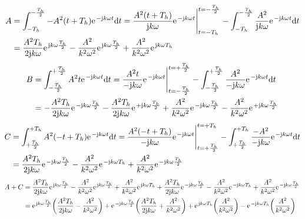 \documentclass[11pt,a4paper,DIV=12]{scrartcl}
\newcommand{\diff}{\mathrm{d}}
\begin{document}
\begin{align}
	A&=\int_{-T_h}^{-\frac{T_h}{2}}-A^2(t+T_h)\e^{-\im k \omega t}\diff t=\frac{A^2(t+T_h)}{\im k \omega }\e^{-\im k \omega t}\Bigg |_{t=-T_h}^{t=-\frac{T_h}{2}}-\int_{-T_h}^{-\frac{T_h}{2}}\frac{A^2}{\im k \omega }\e^{-\im k \omega t}\diff t\nonumber \\
	&=\frac{A^2T_h}{2\im k \omega }\e^{\im k \omega \frac{T_h}{2}}-\frac{A^2}{k^2\omega^2}\e^{\im k \omega \frac{T_h}{2}}+\frac{A^2}{k^2\omega^2}\e^{\im k \omega T_h}
\end{align}
\begin{align}
	B&=\int_{-\frac{T_h}{2}}^{+\frac{T_h}{2}}A^2t\e^{-\im k \omega t}\diff t=\frac{A^2t}{-\im k \omega}\e^{-\im k \omega t}\Bigg |_{t=-\frac{T_h}{2}}^{t=+\frac{T_h}{2}}-\int_{-\frac{T_h}{2}}^{+\frac{T_h}{2}}\frac{A^2}{-\im k \omega}\e^{-\im k \omega t}\diff t\nonumber \\
	&=-\frac{A^2T_h}{2\im k \omega}\e^{-\im k \omega \frac{T_h}{2}}-\frac{A^2T_h}{2\im k \omega}\e^{+\im k \omega \frac{T_h}{2}}+\frac{A^2}{k^2\omega^2}\e^{-\im k \omega \frac{T_h}{2}}-\frac{A^2}{ k^2 \omega^2}\e^{+\im k \omega \frac{T_h}{2}}
\end{align}
\begin{align}
	C&=\int_{+\frac{T_h}{2}}^{+T_h}A^2(-t+T_h)\e^{-\im k \omega t}\diff t=\frac{A^2(-t+T_h)}{-\im k \omega }\e^{-\im k \omega t}\Bigg |_{t=+\frac{T_h}{2}}^{t=+T_h}-\int_{+\frac{T_h}{2}}^{+T_h}\frac{-A^2}{-\im k \omega }\e^{-\im k \omega t}\diff t\nonumber \\
	&=\frac{A^2T_h}{2\im k \omega}\e^{-\im k \omega \frac{T_h}{2}}-\frac{A^2}{k^2\omega^2}\e^{-\im k \omega T_h}+\frac{A^2}{k^2\omega^2}\e^{-\im k \omega \frac{T_h}{2}}
\end{align}
\begin{align}
	A+C&=\frac{A^2T_h}{2\im k \omega }\e^{\im k \omega \frac{T_h}{2}}-\frac{A^2}{k^2\omega^2}\e^{\im k \omega \frac{T_h}{2}}+\frac{A^2}{k^2\omega^2}\e^{\im k \omega T_h}+\frac{A^2T_h}{2\im k \omega}\e^{-\im k \omega \frac{T_h}{2}}-\frac{A^2}{k^2\omega^2}\e^{-\im k \omega T_h}+\frac{A^2}{k^2\omega^2}\e^{-\im k \omega \frac{T_h}{2}}\nonumber \\
	&=\e^{\im k \omega \frac{T_h}{2}}\bigg (\frac{A^2T_h}{2\im k \omega}-\frac{A^2}{k^2\omega^2}\bigg )+\e^{-\im k \omega \frac{T_h}{2}}\bigg (\frac{A^2T_h}{2\im k \omega}+\frac{A^2}{k^2\omega^2}\bigg )+\e^{\im k \omega T_h}\bigg (\frac{A^2}{k^2\omega^2}\bigg )-\e^{-\im k \omega T_h}\bigg (\frac{A^2}{k^2\omega^2}\bigg )
\end{align}
\end{document}
